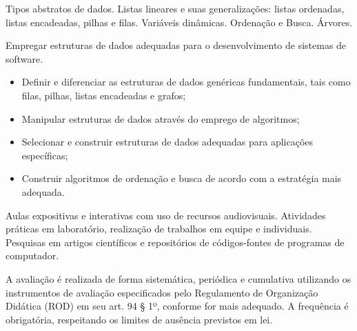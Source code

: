 
\begin{pud}
	
	
	\ementa
	Tipos abstratos de dados. Listas lineares e suas generalizações: listas ordenadas, listas encadeadas, pilhas e filas. Variáveis dinâmicas. Ordenação e Busca. Árvores.
	
	\objetivo
	Empregar estruturas de dados adequadas para o desenvolvimento de sistemas de software.
	\begin{itemize}
	  \item Definir e diferenciar as estruturas de dados genéricas fundamentais, tais como filas, pilhas, listas encadeadas e grafos;
	  \item Manipular estruturas de dados através do emprego de algoritmos;
	  \item Selecionar e construir estruturas de dados adequadas para aplicações específicas;
	  \item Construir algoritmos de ordenação e busca de acordo com a estratégia mais adequada.
	\end{itemize}
	
	
	\programa
	
	\metodologia
	Aulas expositivas e interativas com uso de recursos audiovisuais. Atividades práticas em laboratório, realização de trabalhos em equipe e individuais. Pesquisas em artigos científicos e repositórios de códigos-fontes de programas de computador.
	
	\recursos
	
	
	\avaliacao
	A avaliação é realizada de forma sistemática, periódica e cumulativa utilizando os
instrumentos de avaliação especificados pelo Regulamento de Organização
Didática (ROD) em seu art. 94 § 1º, conforme for mais adequado. A frequência é
obrigatória, respeitando os limites de ausência previstos em lei.
	\naopresencial


	
\end{pud}





